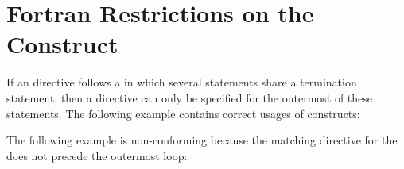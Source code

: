\pagebreak
\section{Fortran Restrictions on the  Construct}
\label{sec:fort_do}
\fortranspecificstart

If an  directive follows a  in which several 
 statements share a  termination statement, then a   
directive can only be specified for the outermost of these  statements. 
The following example contains correct usages of 
 constructs:


The following example is non-conforming because the matching  directive 
for the  does not precede the outermost loop:

\fortranspecificend



